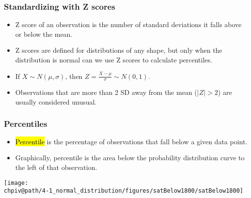 \documentclass[slidestop,compress,mathserif]{beamer}
\makeatletter
\def\chpiv@path{../../Chp 4}
\makeatother
\begin{document}
\begin{frame}
\frametitle{Standardizing with Z scores}

\begin{itemize}

\item Z score of an observation is the number of standard deviations it falls above or below the mean.
\formula{\[Z = \frac{observation - mean}{SD}\]}
\pause

\item Z scores are defined for distributions of any shape, but only when the distribution is normal can we use Z scores to calculate percentiles.
\item If $X \sim N(\mu, \sigma)$, then $Z = \frac{X - \mu}{\sigma} \sim N(0, 1)$.

\pause
\item Observations that are more than 2 SD away from the mean ($|Z| > 2$) are usually considered unusual.

\end{itemize}

\end{frame}


\begin{frame}
\frametitle{Percentiles}

\begin{itemize}

\item \hl{Percentile} is the percentage of observations that fall below a given data point. 

\item Graphically, percentile is the area below the probability distribution curve to the left of that observation.

\end{itemize}

\begin{center}
\texttt{[image: \\chpiv@path/4-1\_normal\_distribution/figures/satBelow1800/satBelow1800]}
\end{center}

\end{frame}
\end{document}
